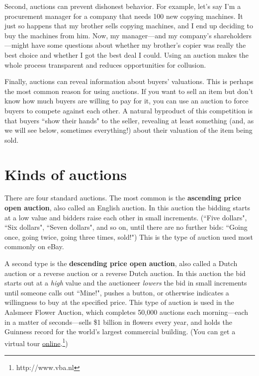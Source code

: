 Second, auctions can prevent dishonest behavior. For example, let's say I'm a procurement manager for a company that needs 100 new copying machines. It just so happens that my brother sells copying machines, and I end up deciding to buy the machines from him. Now, my manager---and my company's shareholders---might have some questions about whether my brother's copier was really the best choice and whether I got the best deal I could. Using an auction makes the whole process transparent and reduces opportunities for collusion.

Finally, auctions can reveal information about buyers' valuations. This is perhaps the most common reason for using auctions. If you want to sell an item but don't know how much buyers are willing to pay for it, you can use an auction to force buyers to compete against each other. A natural byproduct of this competition is that buyers ``show their hands" to the seller, revealing at least something (and, as we will see below, sometimes everything!) about their valuation of the item being sold.

%


\section{Kinds of auctions}

There are four standard auctions. The most common is the \textbf{ascending price open auction}, also called an English auction. In this auction the bidding starts at a low value and bidders raise each other in small increments. (``Five dollars", ``Six dollars", ``Seven dollars", and so on, until there are no further bids: ``Going once, going twice, going three times, sold!") This is the type of auction used most commonly on eBay.

A second type is the \textbf{descending price open auction}, also called a Dutch auction or a reverse auction or a reverse Dutch auction. In this auction the bid starts out at a \emph{high} value and the auctioneer \emph{lowers} the bid in small increments until someone calls out ``Mine!", pushes a button, or otherwise indicates a willingness to buy at the specified price. This type of auction is used in the Aalsmeer Flower Auction, which completes 50,000 auctions each morning---each in a matter of seconds---sells \$1 billion in flowers every year, and holds the Guinness record for the world's largest commercial building. (You can get a virtual tour \href{http://www.vba.nl}{online}.\footnote{http://www.vba.nl})

